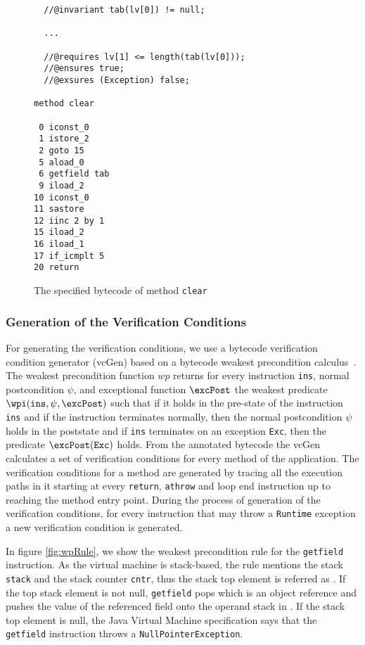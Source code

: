\begin{figure}[thp]
\begin{verbatim}
  //@invariant tab(lv[0]) != null;

  ...

  //@requires lv[1] <= length(tab(lv[0]));
  //@ensures true;
  //@exsures (Exception) false;

method clear

 0 iconst_0
 1 istore_2
 2 goto 15
 5 aload_0
 6 getfield tab
 9 iload_2
10 iconst_0
11 sastore
12 iinc 2 by 1
15 iload_2
16 iload_1
17 if_icmplt 5
20 return
\end{verbatim}

\caption{The specified bytecode of method \texttt{clear}}
\label{bcsl}
\end{figure}


\subsubsection{Generation of the Verification Conditions}
\label{vcGen}
For generating the verification conditions, we use a bytecode verification condition generator (vcGen) based on a bytecode weakest precondition calculus~\cite{JBL05MP}. The weakest precondition function $wp$ returns for every instruction \texttt{ins}, normal postcondition $\psi$, and exceptional function $\excPost$ the weakest predicate \\ $\wpi( \texttt{ins} ,\psi ,\excPost)$ such that if it holds in the pre-state of the instruction \texttt{ins} and if the instruction terminates normally, then the normal postcondition $\psi$ holds in the poststate and if \texttt{ins} terminates on an exception \texttt{Exc}, then the predicate $\excPost(\texttt{Exc})$ holds. From the annotated bytecode the vcGen calculates a set of verification conditions for every method of the application. The verification conditions for a method are generated by tracing all the execution paths in it starting at every \texttt{return}, \texttt{athrow} and loop end instruction up to reaching the method entry point. During the process of generation of the verification conditions, for every instruction that may throw a \verb!Runtime! exception a new verification condition is generated.

In figure \ref{fig:wpRule}, we show the weakest precondition rule for the \texttt{getfield} instruction. As the virtual machine is stack-based, the rule mentions the stack \texttt{stack} and the stack counter \texttt{cntr}, thus the stack top element is referred as \stack{\counter}. If the top stack element \stack{\counter} is not null, \texttt{getfield} pops \stack{\counter} which is an object reference and pushes the value of the referenced field onto the operand stack in \stack{\counter}. If the stack top element is null, the Java Virtual Machine specification says that the \texttt{getfield} instruction throws a \texttt{NullPointerException}.

